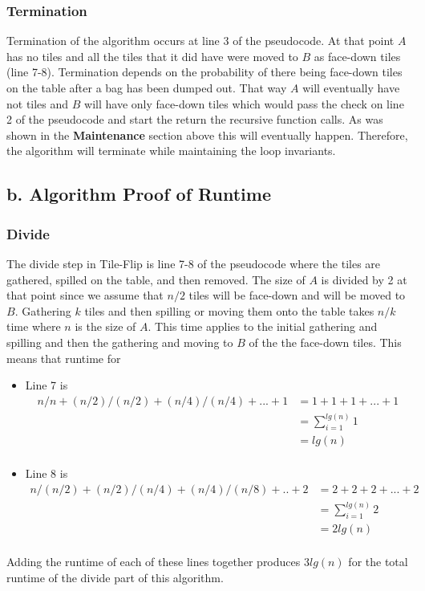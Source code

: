 \documentclass[12pt]{article}
\begin{document}
\subsubsection*{Termination}
Termination of the algorithm occurs at line 3 of the pseudocode.  At that point $A$ has no tiles and all the tiles that it did have were moved to $B$ as face-down tiles (line 7-8).  Termination depends on the probability of there being face-down tiles on the table after a bag has been dumped out.  That way $A$ will eventually have not tiles and $B$ will have only face-down tiles which would pass the check on line 2 of the pseudocode and start the return the recursive function calls.  As was shown in the \textbf{Maintenance} section above this will eventually happen.  Therefore, the algorithm will terminate while maintaining the loop invariants.

\subsection*{b. Algorithm Proof of Runtime}

\subsubsection*{Divide}
The divide step in Tile-Flip is line 7-8 of the pseudocode where the tiles are gathered, spilled on the table, and then removed.  The size of $A$ is divided by 2 at that point since we assume that $n/2$ tiles will be face-down and will be moved to $B$.
Gathering $k$ tiles and then spilling or moving them onto the table takes $n/k$ time where $n$ is the size of $A$.  This time applies to the initial gathering and spilling and then the gathering and moving to $B$ of the the face-down tiles.  This means that runtime for 
\begin{itemize}
\item Line 7 is 
\begin{align*}
n/n + (n/2)/(n/2) + (n/4)/(n/4) +...+ 1 &= 1+1+1+...+1 \\
						       &=  \sum_{i=1}^{lg(n)} 1\\
						       &=lg(n)\\
\end{align*}
\item Line 8 is 
\begin{align*}
n/(n/2) + (n/2)/(n/4) + (n/4)/(n/8) +..+2 &= 2+2+2+...+2\\
							  &= \sum_{i=1}^{lg(n)} 2\\
							  &=2lg(n)\\
\end{align*}
\end{itemize}  
Adding the runtime of each of these lines together produces $3lg(n)$ for the total runtime of the divide part of this algorithm.\\
\end{document}
